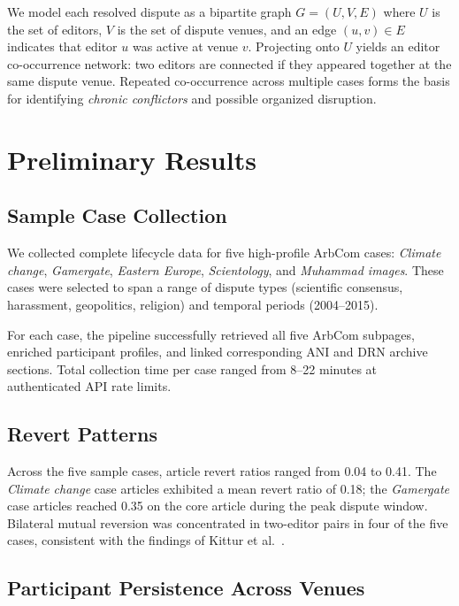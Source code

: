 \documentclass[conference]{IEEEtran}
\begin{document}
We model each resolved dispute as a bipartite graph $G = (U, V, E)$ where $U$
is the set of editors, $V$ is the set of dispute venues, and an edge
$(u, v) \in E$ indicates that editor $u$ was active at venue $v$. Projecting
onto $U$ yields an editor co-occurrence network: two editors are connected if
they appeared together at the same dispute venue. Repeated co-occurrence across
multiple cases forms the basis for identifying \emph{chronic conflictors} and
possible organized disruption.

\section{Preliminary Results}

\subsection{Sample Case Collection}

We collected complete lifecycle data for five high-profile ArbCom cases:
\textit{Climate change}, \textit{Gamergate}, \textit{Eastern Europe},
\textit{Scientology}, and \textit{Muhammad images}. These cases were selected
to span a range of dispute types (scientific consensus, harassment,
geopolitics, religion) and temporal periods (2004--2015).

For each case, the pipeline successfully retrieved all five ArbCom subpages,
enriched participant profiles, and linked corresponding ANI and DRN archive
sections. Total collection time per case ranged from 8--22 minutes at
authenticated API rate limits.

\subsection{Revert Patterns}

Across the five sample cases, article revert ratios ranged from 0.04 to
0.41. The \textit{Climate change} case articles exhibited a mean revert ratio
of 0.18; the \textit{Gamergate} case articles reached 0.35 on the core
article during the peak dispute window. Bilateral mutual reversion was
concentrated in two-editor pairs in four of the five cases, consistent with
the findings of Kittur et al.~\cite{b_kittur2007}.

\subsection{Participant Persistence Across Venues}
\end{document}
